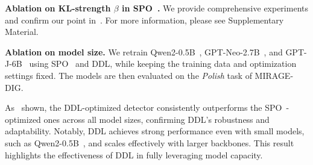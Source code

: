 \begin{table}[htbp]
    \centering
    \caption{Results of different $\gamma$ in DDL. Metrics with subscript $_t$ correspond to the training set, and subscript $_v$ indicates evaluation on the polish task of MIRAGE-DIG.}
    \label{tab:ablation_gamma}
\end{table}

\noindent \textbf{Ablation on KL-strength $\beta$ in SPO~\cite{imbd}. } We provide comprehensive experiments and confirm our point in~.
%
For more information, please see Supplementary Material.

\noindent \textbf{Ablation on model size. }
We retrain Qwen2-0.5B~\cite{qwen2}, GPT-Neo-2.7B~\cite{gpt-neo}, and GPT-J-6B~\cite{gpt-j} using SPO~\cite{imbd} and DDL, while keeping the training data and optimization settings fixed.
%
The models are then evaluated on the \textit{Polish} task of MIRAGE-DIG.

As~ shown, the DDL-optimized detector consistently outperforms the SPO~\cite{imbd}-optimized ones across all model sizes, confirming DDL's robustness and adaptability.
%
Notably, DDL achieves strong performance even with small models, such as Qwen2-0.5B~\cite{qwen2}, and scales effectively with larger backbones.
%
This result highlights the effectiveness of DDL in fully leveraging model capacity.


